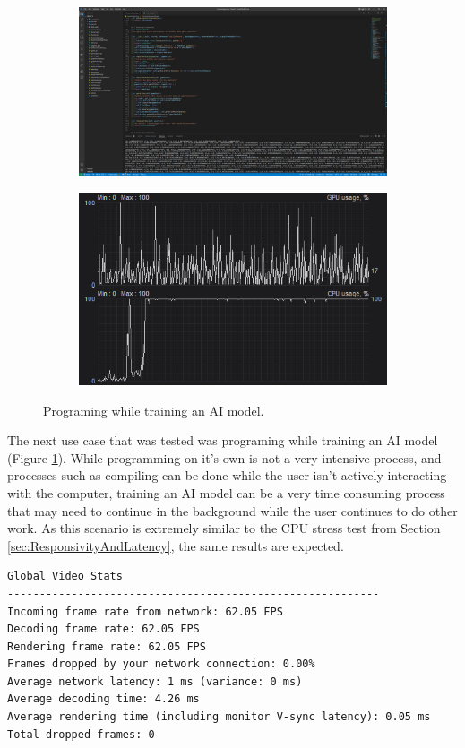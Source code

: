 \begin{figure}[t]
  \centering
  \begin{subfigure}{1\textwidth}
    \centering
    \includegraphics[width=.9\linewidth]{Figures/realworld/ai}
  \end{subfigure}
  \begin{subfigure}{1\textwidth}
    \centering
    \includegraphics[width=.5\linewidth]{Figures/realworld/aistats}
  \end{subfigure}
  \caption[Streaming the training of an AI]{Programing while training an AI model.}
  \label{fig:RealWorldAI}
\end{figure}

The next use case that was tested was programing while training an AI model (Figure \ref{fig:RealWorldAI}).
While programming on it's own is not a very intensive process, and processes such as compiling can be done while the user isn't actively interacting with the computer, training an AI model can be a very time consuming process that may need to continue in the background while the user continues to do other work.
As this scenario is extremely similar to the CPU stress test from Section \ref{sec:ResponsivityAndLatency}, the same results are expected.

\begin{lstlisting}[style=plaintext,title=Statistics recorded while training an AI (Figure \ref{fig:RealWorldAI})]
Global Video Stats
----------------------------------------------------------
Incoming frame rate from network: 62.05 FPS
Decoding frame rate: 62.05 FPS
Rendering frame rate: 62.05 FPS
Frames dropped by your network connection: 0.00%
Average network latency: 1 ms (variance: 0 ms)
Average decoding time: 4.26 ms
Average rendering time (including monitor V-sync latency): 0.05 ms
Total dropped frames: 0
\end{lstlisting}

